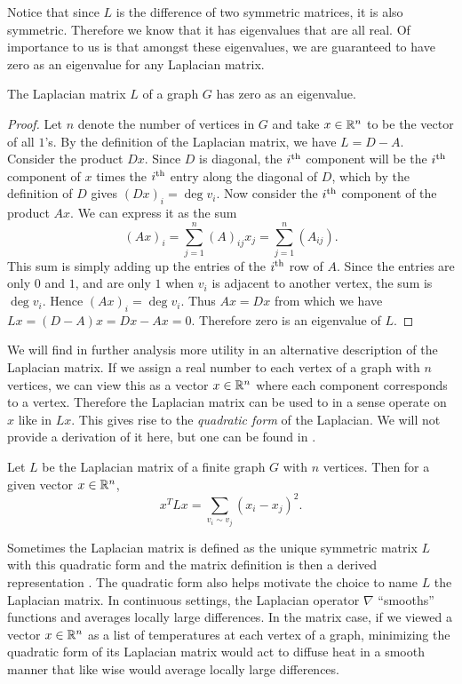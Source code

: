 \documentclass[11pt]{article}
\begin{document}
Notice that since $L$ is the difference of two symmetric matrices, it is also symmetric. Therefore we know that it has eigenvalues that are all real. Of importance to us is that amongst these eigenvalues, we are guaranteed to have zero as an eigenvalue for any Laplacian matrix.

\begin{theorem}
    \label{thm:lap_zero_eig_always}
    The Laplacian matrix $L$ of a graph $G$ has zero as an eigenvalue.
\end{theorem}

\begin{proof}
    Let $n$ denote the number of vertices in $G$ and take $x \in \mathbb{R}^n$ to be the vector of all $1$'s. By the definition of the Laplacian matrix, we have $L = D - A$. Consider the product $D x$. Since $D$ is diagonal, the $i^{\text{th}}$ component will be the $i^{\text{th}}$ component of $x$ times the $i^{\text{th}}$ entry along the diagonal of $D$, which by the definition of $D$ gives $(Dx)_i = \deg v_i$. Now consider the $i^{\text{th}}$ component of the product $Ax$. We can express it as the sum
    \[
        (Ax)_i = \sum_{j=1}^n (A)_{ij} x_j = \sum_{j=1}^n (A_{ij})
    .\]
    This sum is simply adding up the entries of the $i^{\text{th}}$ row of $A$. Since the entries are only $0$ and $1$, and are only $1$ when $v_i$ is adjacent to another vertex, the sum is $\deg v_i$. Hence $(Ax)_i = \deg v_i$. Thus $Ax = Dx$ from which we have $Lx = (D - A)x = Dx - Ax = 0$. Therefore zero is an eigenvalue of $L$.
\end{proof}

We will find in further analysis more utility in an alternative description of the Laplacian matrix. If we assign a real number to each vertex of a graph with $n$ vertices, we can view this as a vector $x \in \mathbb{R}^n$ where each component corresponds to a vertex. Therefore the Laplacian matrix can be used to in a sense operate on $x$ like in $Lx$. This gives rise to the \emph{quadratic form} of the Laplacian. We will not provide a derivation of it here, but one can be found in \cite{mohar2004graph}.

\begin{theorem}
    Let $L$ be the Laplacian matrix of a finite graph $G$ with $n$ vertices. Then for a given vector $x \in \mathbb{R}^n$,
    \[
        x^T L x = \sum_{v_i \sim v_j} (x_i - x_j)^2.
    \]
\end{theorem}

\begin{remark}
    Sometimes the Laplacian matrix is defined as the unique symmetric matrix $L$ with this quadratic form and the matrix definition is then a derived representation \cite{WATKINS199443}. The quadratic form also helps motivate the choice to name $L$ the Laplacian matrix. In continuous settings, the Laplacian operator $\nabla$ ``smooths'' functions and averages locally large differences. In the matrix case, if we viewed a vector $x \in \mathbb{R}^n$ as a list of temperatures at each vertex of a graph, minimizing the quadratic form of its Laplacian matrix would act to diffuse heat in a smooth manner that like wise would average locally large differences.
\end{remark}
\end{document}
